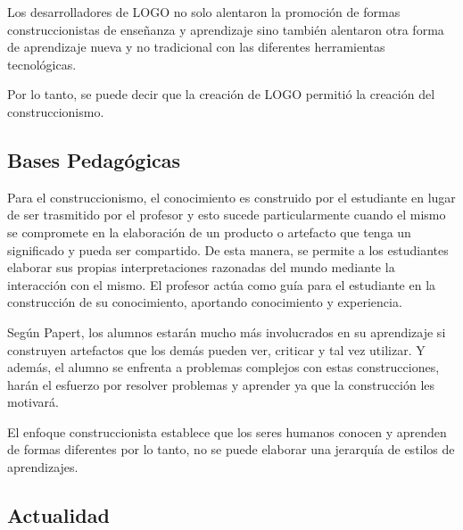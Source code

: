 Los desarrolladores de LOGO no solo alentaron la promoción de formas
construccionistas de enseñanza y aprendizaje sino también alentaron otra forma
de aprendizaje nueva y no tradicional con las diferentes herramientas
tecnológicas\cite{historia:2014}. 

Por lo tanto, se puede decir que la creación de LOGO permitió la creación del
construccionismo\cite{historia:2014}.

    
    


\subsection{Bases Pedagógicas}

Para el construccionismo, el conocimiento es construido por el estudiante en
lugar de ser trasmitido por el profesor \cite{moses:2003} y esto sucede particularmente cuando
el mismo se compromete en la elaboración de un producto o artefacto que tenga un
significado y pueda ser compartido\cite{valdivia:sg}. De esta manera, se permite
a los estudiantes elaborar sus propias interpretaciones razonadas del mundo
mediante la interacción con el mismo. El profesor actúa como guía para el estudiante 
en la construcción de su conocimiento, aportando conocimiento y experiencia.

Según Papert, los alumnos estarán mucho más involucrados en su aprendizaje si
construyen artefactos que los demás pueden ver, criticar y tal vez utilizar. Y
además, el alumno se enfrenta a problemas complejos con estas construcciones,
harán el esfuerzo por resolver problemas y aprender ya que la construcción les
motivará\cite{const:vs}.

El enfoque construccionista establece que los seres humanos conocen y aprenden
de formas diferentes por lo tanto, no se puede elaborar una jerarquía de estilos
de aprendizajes\cite{valdivia:sg}.

\subsection{Actualidad}



